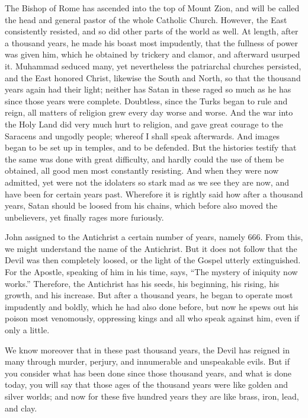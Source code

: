 The Bishop of Rome has ascended into the top of Mount Zion, and will be called the head and general pastor of the whole Catholic Church. However, the East consistently resisted, and so did other parts of the world as well. At length, after a thousand years, he made his boast most impudently, that the fullness of power was given him, which he obtained by trickery and clamor, and afterward usurped it. Muhammad seduced many, yet nevertheless the patriarchal churches persisted, and the East honored Christ, likewise the South and North, so that the thousand years again had their light; neither has Satan in these raged so much as he has since those years were complete. Doubtless, since the Turks began to rule and reign, all matters of religion grew every day worse and worse. And the war into the Holy Land did very much hurt to religion, and gave great courage to the Saracens and ungodly people; whereof I shall speak afterwards. And images began to be set up in temples, and to be defended. But the histories testify that the same was done with great difficulty, and hardly could the use of them be obtained, all good men most constantly resisting. And when they were now admitted, yet were not the idolaters so stark mad as we see they are now, and have been for certain years past. Wherefore it is rightly said how after a thousand years, Satan should be loosed from his chains, which before also moved the unbelievers, yet finally rages more furiously.

John assigned to the Antichrist a certain number of years, namely 666. From this, we might understand the name of the Antichrist. But it does not follow that the Devil was then completely loosed, or the light of the Gospel utterly extinguished. For the Apostle, speaking of him in his time, says, “The mystery of iniquity now works.” Therefore, the Antichrist has his seeds, his beginning, his rising, his growth, and his increase. But after a thousand years, he began to operate most impudently and boldly, which he had also done before, but now he spews out his poison most venomously, oppressing kings and all who speak against him, even if only a little.

We know moreover that in these past thousand years, the Devil has reigned in many through murder, perjury, and innumerable and unspeakable evils. But if you consider what has been done since those thousand years, and what is done today, you will say that those ages of the thousand years were like golden and silver worlds; and now for these five hundred years they are like brass, iron, lead, and clay.


